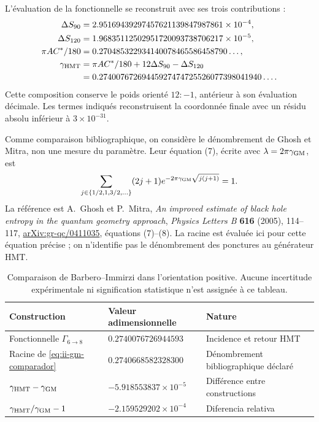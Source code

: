 L’évaluation de la fonctionnelle se reconstruit avec ses trois contributions :
\begin{align*}
 \Delta S_{90}&=2.95169439297457621139847987861\times10^{-4},\\
 \Delta S_{120}&=1.96835112502951720093738706217\times10^{-5},\\
 \pi AC^*/180&=0.270485322934140078465586458790\ldots,\\
 \gamma_{\rm HMT}&=\pi AC^*/180+12\Delta S_{90}-\Delta S_{120}\\
 &=0.27400767269445927474725526077398041940\ldots.
\end{align*}
Cette composition conserve le poids orienté \(12:-1\), antérieur à son
évaluation décimale. Les termes indiqués reconstruisent la coordonnée
finale avec un résidu absolu inférieur à \(3\times10^{-31}\).

Comme comparaison bibliographique, on considère le dénombrement de Ghosh et Mitra,
non une mesure du paramètre. Leur équation (7), écrite avec
\(\lambda=2\pi\gamma_{\rm GM}\), est
\begin{equation}
 \sum_{j\in\{1/2,1,3/2,\ldots\}}(2j+1)
 e^{-2\pi\gamma_{\rm GM}\sqrt{j(j+1)}}=1.
 \label{eq:ii-gm-comparador}
\end{equation}
La référence est A.~Ghosh et P.~Mitra,
\emph{An improved estimate of black hole entropy in the quantum geometry
approach}, \emph{Physics Letters B} \textbf{616} (2005), 114--117,
\href{https://arxiv.org/abs/gr-qc/0411035}{arXiv:gr-qc/0411035},
équations (7)--(8). La racine est évaluée ici pour cette équation précise ;
on n’identifie pas le dénombrement des ponctures au générateur HMT.

\begin{table}[htbp]
\centering\small
\begin{tabular}{@{}lll@{}}
\toprule
Construction & Valeur adimensionnelle & Nature\\
\midrule
Fonctionnelle \(\Gamma_{6\to8}\) & \(0.2740076726944593\) & Incidence et retour HMT\\
Racine de \eqref{eq:ii-gm-comparador} & \(0.2740668582328300\) & Dénombrement bibliographique déclaré\\
\midrule
\(\gamma_{\rm HMT}-\gamma_{\rm GM}\) & \(-5.918553837\times10^{-5}\) & Différence entre constructions\\
\(\gamma_{\rm HMT}/\gamma_{\rm GM}-1\) & \(-2.159529202\times10^{-4}\) & Diferencia relativa\\
\bottomrule
\end{tabular}
\caption{Comparaison de Barbero--Immirzi dans l’orientation positive. Aucune
incertitude expérimentale ni signification statistique n’est assignée à ce tableau.}
\label{tab:ii-barbero-comparacion}
\end{table}


